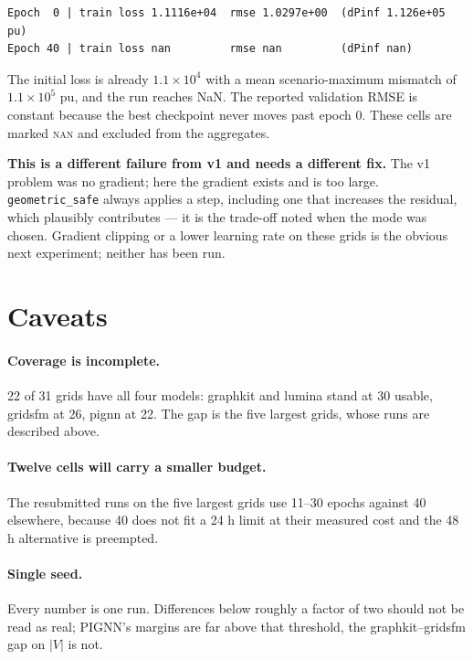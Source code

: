 \documentclass[10pt]{article}
\begin{document}
\begin{verbatim}
Epoch  0 | train loss 1.1116e+04  rmse 1.0297e+00  (dPinf 1.126e+05 pu)
Epoch 40 | train loss nan         rmse nan         (dPinf nan)
\end{verbatim}

The initial loss is already $1.1\times10^{4}$ with a mean scenario-maximum mismatch of
$1.1\times10^{5}$ pu, and the run reaches NaN. The reported validation RMSE is
constant because the best checkpoint never moves past epoch 0. These cells are
marked \textsc{nan} and excluded from the aggregates.

\textbf{This is a different failure from v1 and needs a different fix.} The v1
problem was no gradient; here the gradient exists and is too large.
\texttt{geometric\_safe} always applies a step, including one that increases the
residual, which plausibly contributes --- it is the trade-off noted when the
mode was chosen. Gradient clipping or a lower learning rate on these grids is
the obvious next experiment; neither has been run.

\section{Caveats}

\paragraph{Coverage is incomplete.} 22 of 31 grids have all four models:
graphkit and lumina stand at 30 usable, gridsfm at 26, pignn at 22. The gap is
the five largest grids, whose runs are described above.

\paragraph{Twelve cells will carry a smaller budget.} The resubmitted runs on
the five largest grids use 11--30 epochs against 40 elsewhere, because 40 does
not fit a 24 h limit at their measured cost and the 48 h alternative is
preempted.

\paragraph{Single seed.} Every number is one run. Differences below roughly a
factor of two should not be read as real; PIGNN's margins are far above that
threshold, the graphkit--gridsfm gap on $|V|$ is not.
\end{document}
